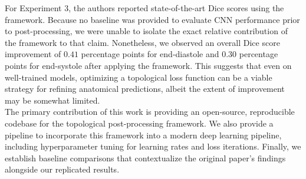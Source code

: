 For Experiment 3, the authors reported state-of-the-art Dice scores using the framework. Because no baseline was provided to evaluate CNN performance prior to post-processing, we were unable to isolate the exact relative contribution of the framework to that claim. Nonetheless, we observed an overall Dice score improvement of $0.41$ percentage points for end-diastole and $0.30$ percentage points for end-systole after applying the framework. This suggests that even on well-trained models, optimizing a topological loss function can be a viable strategy for refining anatomical predictions, albeit the extent of improvement may be somewhat limited. \\

The primary contribution of this work is providing an open-source, reproducible codebase for the topological post-processing framework. We also provide a pipeline to incorporate this framework into a modern deep learning pipeline, including hyperparameter tuning for learning rates and loss iterations. Finally, we establish baseline comparisons that contextualize the original paper's findings alongside our replicated results.

